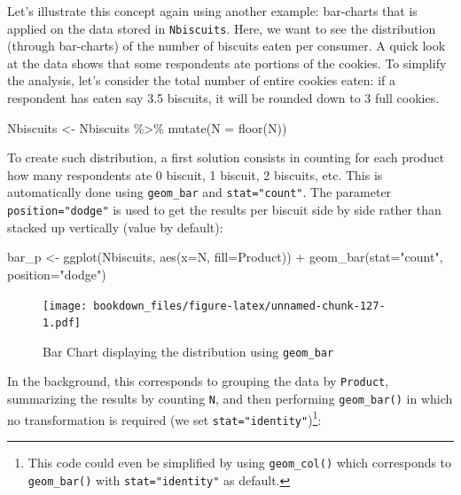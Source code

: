 \documentclass[
]{krantz}
\makeatletter
\newenvironment{Shaded}{\begin{snugshade}}{\end{snugshade}}
\newcommand{\AttributeTok}[1]{\textcolor[rgb]{0.61,0.61,0.61}{#1}}
\newcommand{\FunctionTok}[1]{\textcolor[rgb]{0,0,0}{#1}}
\newcommand{\NormalTok}[1]{#1}
\newcommand{\OtherTok}[1]{\textcolor[rgb]{0.37,0.37,0.37}{#1}}
\newcommand{\SpecialCharTok}[1]{\textcolor[rgb]{0,0,0}{#1}}
\newcommand{\StringTok}[1]{\textcolor[rgb]{0.5,0.5,0.5}{#1}}
\newenvironment{kframe}{%
\medskip{}
\setlength{\fboxsep}{.8em}
 \def\at@end@of@kframe{}%
 \ifinner\ifhmode%
  \def\at@end@of@kframe{\end{minipage}}%
  \begin{minipage}{\columnwidth}%
 \fi\fi%
 \def\FrameCommand##1{\hskip\@totalleftmargin \hskip-\fboxsep
 \colorbox{shadecolor}{##1}\hskip-\fboxsep
     \hskip-\linewidth \hskip-\@totalleftmargin \hskip\columnwidth}%
 \MakeFramed {\advance\hsize-\width
   \@totalleftmargin\z@ \linewidth\hsize
   \@setminipage}}%
 {\par\unskip\endMakeFramed%
 \at@end@of@kframe}
\renewenvironment{Shaded}{\begin{kframe}}{\end{kframe}}
\makeatother
\begin{document}
Let's illustrate this concept again using another example: bar-charts that is applied on the data stored in \texttt{Nbiscuits}.
Here, we want to see the distribution (through bar-charts) of the number of biscuits eaten per consumer. A quick look at the data shows that some respondents ate portions of the cookies. To simplify the analysis, let's consider the total number of entire cookies eaten: if a respondent has eaten say 3.5 biscuits, it will be rounded down to 3 full cookies.

\begin{Shaded}
\begin{Highlighting}[]
\NormalTok{Nbiscuits }\OtherTok{\textless{}{-}}\NormalTok{ Nbiscuits }\SpecialCharTok{\%\textgreater{}\%} 
  \FunctionTok{mutate}\NormalTok{(}\AttributeTok{N =} \FunctionTok{floor}\NormalTok{(N))}
\end{Highlighting}
\end{Shaded}

To create such distribution, a first solution consists in counting for each product how many respondents ate 0 biscuit, 1 biscuit, 2 biscuits, etc. This is automatically done using \texttt{geom\_bar} and \texttt{stat="count"}. The parameter \texttt{position="dodge"} is used to get the results per biscuit side by side rather than stacked up vertically (value by default):

\begin{Shaded}
\begin{Highlighting}[]
\NormalTok{bar\_p }\OtherTok{\textless{}{-}} \FunctionTok{ggplot}\NormalTok{(Nbiscuits, }\FunctionTok{aes}\NormalTok{(}\AttributeTok{x=}\NormalTok{N, }\AttributeTok{fill=}\NormalTok{Product)) }\SpecialCharTok{+}
  \FunctionTok{geom\_bar}\NormalTok{(}\AttributeTok{stat=}\StringTok{"count"}\NormalTok{, }\AttributeTok{position=}\StringTok{"dodge"}\NormalTok{)}
\end{Highlighting}
\end{Shaded}

\begin{figure}
\centering
\texttt{[image: bookdown\_files/figure-latex/unnamed-chunk-127-1.pdf]}
\caption{\label{fig:unnamed-chunk-127}Bar Chart displaying the distribution using \texttt{geom\_bar}}
\end{figure}

In the background, this corresponds to grouping the data by \texttt{Product}, summarizing the results by counting \texttt{N}, and then performing \texttt{geom\_bar()} in which no transformation is required (we set \texttt{stat="identity"})\footnote{This code could even be simplified by using \texttt{geom\_col()} which corresponds to \texttt{geom\_bar()} with \texttt{stat="identity"} as default.}:
\end{document}
